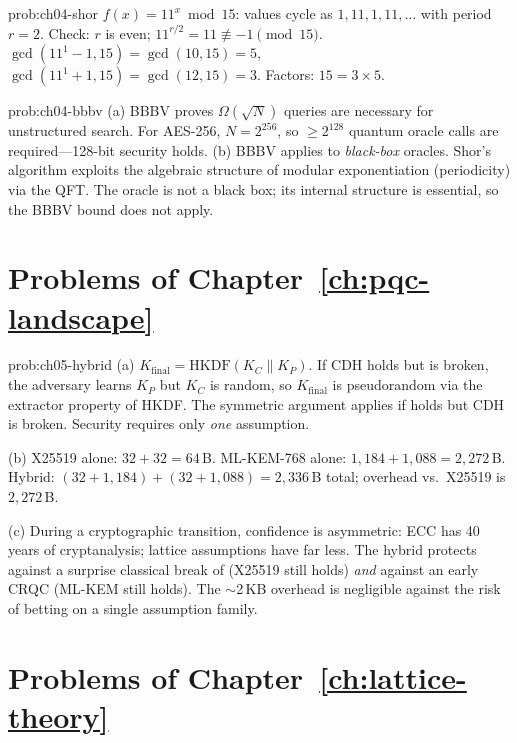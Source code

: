 \begin{sol}{prob:ch04-shor}
$f(x)=11^x\bmod 15$: values cycle as $1,11,1,11,\ldots$ with period $r=2$.
Check: $r$ is even\;\checkmark;\; $11^{r/2}=11\not\equiv -1\pmod{15}$\;\checkmark.
$\gcd(11^1-1,15) = \gcd(10,15)=5$, $\gcd(11^1+1,15) = \gcd(12,15)=3$.
Factors: $15 = 3\times 5$.
\end{sol}

\begin{sol}{prob:ch04-bbbv}
(a) BBBV proves $\Omega(\sqrt{N})$ queries are necessary for unstructured search.  For AES-256, $N=2^{256}$, so $\geq 2^{128}$ quantum oracle calls are required---128-bit security holds.
(b) BBBV applies to \emph{black-box} oracles.  Shor's algorithm exploits the algebraic structure of modular exponentiation (periodicity) via the QFT.  The oracle is not a black box; its internal structure is essential, so the BBBV bound does not apply.
\end{sol}

\section*{Problems of Chapter~\ref{ch:pqc-landscape}}

\begin{sol}{prob:ch05-hybrid}
(a) $K_{\mathrm{final}} = \mathrm{HKDF}(K_C\|K_P)$.  If CDH holds but \mlwe{} is broken, the adversary learns $K_P$ but $K_C$ is random, so $K_{\mathrm{final}}$ is pseudorandom via the extractor property of HKDF.  The symmetric argument applies if \mlwe{} holds but CDH is broken.  Security requires only \emph{one} assumption.

(b) X25519 alone: $32+32=64$\,B.  ML-KEM-768 alone: $1{,}184+1{,}088=2{,}272$\,B.
Hybrid: $(32+1{,}184)+(32+1{,}088) = 2{,}336$\,B total; overhead vs.\ X25519 is $2{,}272$\,B.

(c) During a cryptographic transition, confidence is asymmetric: ECC has 40 years of cryptanalysis; lattice assumptions have far less.  The hybrid protects against a surprise classical break of \mlwe{} (X25519 still holds) \emph{and} against an early CRQC (ML-KEM still holds).  The $\sim$2\,KB overhead is negligible against the risk of betting on a single assumption family.
\end{sol}

\section*{Problems of Chapter~\ref{ch:lattice-theory}}

